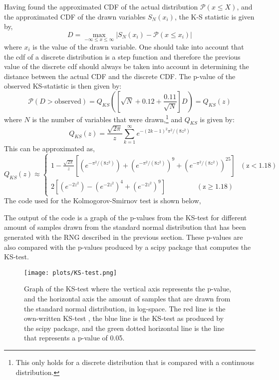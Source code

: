 Having found the approximated CDF of the actual distribution $\mathcal{P}(x\leq X)$, and the approximated CDF of the drawn variables $S_N(x_i)$, the K-S statistic is given by,
\begin{equation*}
D = \underset{-\infty \leq x \leq \infty}{\max}|S_N(x_i) - \mathcal{P}(x \leq x_i)|
\end{equation*}
where $x_i$ is the value of the drawn variable. One should take into account that the cdf of a discrete distribution is a step function and therefore the previous value of the discrete cdf should always be taken into account in determining the distance between the actual CDF and the discrete CDF. The p-value of the observed KS-statistic is then given by:
\begin{equation*}
\mathcal{P}(D > \mathrm{observed}) = Q_{KS}\left(\left[\sqrt{N} + 0.12 + \frac{0.11}{\sqrt{N}}\right]D\right) = Q_{KS}(z)
\end{equation*}
where $N$ is the number of variables that were drawn,\footnote{This only holds for a discrete distribution that is compared with a continuous distribution.} and $Q_{KS}$ is given by:
\begin{equation*}
Q_{KS}(z) = \frac{\sqrt{2\pi}}{z}\sum_{k=1}^{\infty} e^{-(2k-1)^2\pi^2/(8z^2)}
\end{equation*}
This can be approximated as,
\begin{equation}
Q_{KS}(z) \approx \begin{cases}
1 - \frac{\sqrt{2\pi}}{z}\left[(e^{-\pi^2/(8z^2)}) + (e^{-\pi^2/(8z^2)})^9 + (e^{-\pi^2/(8z^2)})^{25}\right] \mathrm{\ \ \ (z < 1.18)}\\
2\left[(e^{-2z^2}) - (e^{-2z^2})^4 + (e^{-2z^2})^9\right] \mathrm{\ \ \ \ \ \ \ \ \ \ \ \ \ \ \ \ \ \ \ \ (z\geq 1.18)}
\end{cases}
\end{equation}
The code used for the Kolmogorov-Smirnov test is shown below,



The output of the code is a graph of the p-values from the KS-test for different amount of samples drawn from the standard normal distribution that has been generated with the RNG described in the previous section. These p-values are also compared with the p-values produced by a scipy package that computes the KS-test.

\begin{figure}[h]
\centering
\texttt{[image: plots/KS-test.png]}
\caption{Graph of the KS-test where the vertical axis represents the p-value, and the horizontal axis the amount of samples that are drawn from the standard normal distribution, in log-space. The red line is the own-written KS-test , the blue line is the KS-test as produced by the scipy package, and the green dotted horizontal line is the line that represents a p-value of 0.05.}


\label{KS-test}
\end{figure}

